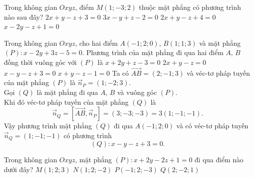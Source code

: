 \begin{ex}%
	Trong không gian $Oxyz$, điểm $M(1;-3;2)$ thuộc mặt phẳng có phương trình nào sau đây?
	\choice 
	{\True$2x+y-z+3=0$}
	{$3x-y+z-2=0$}
	{$2x+y-z+4=0$}
	{$x-2y-z+1=0$}
\end{ex}
\begin{ex}%
	Trong không gian $Oxyz$, cho hai điểm $A(-1;2;0)$, $B(1;1;3)$ và mặt phẳng $(P)\colon x-2y+3z-5=0$. Phương trình của mặt phẳng đi qua hai điểm $A$, $B$ đồng thời vuông góc với $(P)$ là
	\choice
	{$x+2y+z-3=0$}
	{$2x+y-z=0$}
	{\True $x-y-z+3=0$}
	{$x+y-z-1=0$}
	\loigiai
	{
		Ta có $\overrightarrow{AB}=(2;-1;3)$ và véc-tơ pháp tuyến của mặt phẳng $(P)$ là $\overrightarrow{n}_P=(1;-2;3)$.\\
		Gọi $(Q)$ là mặt phẳng đi qua $A$, $B$ và vuông góc $(P)$.\\
		Khi đó véc-tơ pháp tuyến của mặt phẳng $(Q)$ là $$\overrightarrow{n}_Q=\left[\overrightarrow{AB}, \overrightarrow{n}_P\right]=(3;-3;-3)=3(1;-1;-1).$$
		Vậy phương trình mặt phẳng $(Q)$ đi qua $A(-1;2;0)$ và có véc-tơ pháp tuyến $\overrightarrow{n}_Q=(1;-1;-1)$ có phương trình
		$$(Q)\colon x-y-z+3=0.$$
	}
\end{ex}


\begin{ex}%
	Trong không gian $Oxyz$, mặt phẳng $(P)\colon x+2y-2z+1=0$ đi qua điểm nào dưới đây?
	\choice
	{\True $M(1;2;3)$}
	{$N(1;2;-2)$}
	{$P(-1;2;-3)$}
	{$Q(2;-2;1)$}
\end{ex}	

